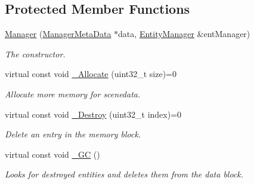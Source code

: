 \subsection*{Protected Member Functions}
\begin{DoxyCompactItemize}
\item 
\hyperlink{class_ensum_1_1_components_1_1_manager_ab75b75d4c5936733c4af3840a4fc7f5c}{Manager} (\hyperlink{struct_ensum_1_1_components_1_1_manager_1_1_manager_meta_data}{Manager\+Meta\+Data} $\ast$data, \hyperlink{class_ensum_1_1_components_1_1_entity_manager}{Entity\+Manager} \&ent\+Manager)
\begin{DoxyCompactList}\small\item\em The constructor. \end{DoxyCompactList}\item 
virtual const void \hyperlink{class_ensum_1_1_components_1_1_manager_a1b593059210d09632c910a6abaae49c0}{\+\_\+\+Allocate} (uint32\+\_\+t size)=0
\begin{DoxyCompactList}\small\item\em Allocate more memory for scenedata. \end{DoxyCompactList}\item 
virtual const void \hyperlink{class_ensum_1_1_components_1_1_manager_a5ba85395802e942ed8904ca18951e6b0}{\+\_\+\+Destroy} (uint32\+\_\+t index)=0
\begin{DoxyCompactList}\small\item\em Delete an entry in the memory block. \end{DoxyCompactList}\item 
virtual const void \hyperlink{class_ensum_1_1_components_1_1_manager_a646aca9437267a1da465862ba7cc77a3}{\+\_\+\+GC} ()\hypertarget{class_ensum_1_1_components_1_1_manager_a646aca9437267a1da465862ba7cc77a3}{}\label{class_ensum_1_1_components_1_1_manager_a646aca9437267a1da465862ba7cc77a3}

\begin{DoxyCompactList}\small\item\em Looks for destroyed entities and deletes them from the data block. \end{DoxyCompactList}\end{DoxyCompactItemize}
